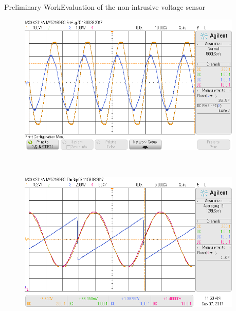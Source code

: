 \begin{frame}{Preliminary Work}{Evaluation of the non-intrusive voltage sensor}
\begin{figure}[h!]
	\centering
	\begin{minipage}{.48\textwidth}
		\centering
		\includegraphics[width=0.95\textwidth,keepaspectratio]{figures/50.PreliminaryW/scope_0}
		\label{fig:5.scope_9}
	\end{minipage}%
	\begin{minipage}{.01\textwidth}  ~\end{minipage}	
	\begin{minipage}{.48\textwidth}
		\centering
		\includegraphics[width=0.95\textwidth,keepaspectratio]{figures/50.PreliminaryW/scope_10}
		\label{fig:5.scope_10}
	\end{minipage}
\end{figure}
\end{frame}
